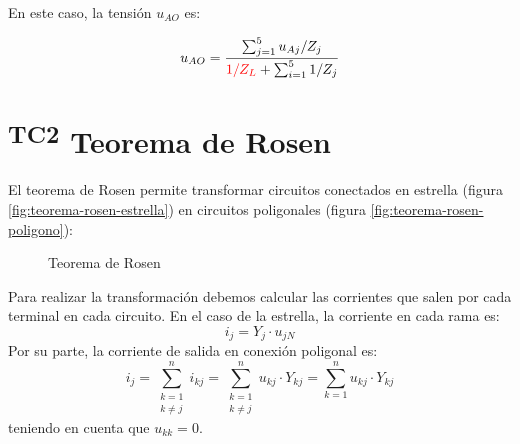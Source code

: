 En este caso, la tensión $u_{AO}$ es:

\begin{equation}
  u_{AO} = \frac{\sum_{j = 1}^5 u_{Aj}/Z_j}{{\color{red} 1/Z_L} + \sum_{i = 1}^5 1/Z_j}
\end{equation}

\section{\textsuperscript{TC2}  Teorema de Rosen}
\label{sec:teorema-rosen}

El teorema de Rosen permite transformar circuitos conectados en estrella (figura \ref{fig:teorema-rosen-estrella}) en circuitos poligonales (figura \ref{fig:teorema-rosen-poligono}):
\begin{figure}[H]
  \centering
  \hspace{2cm}
  \caption{Teorema de Rosen}
  \label{fig:teorema-rosen}
\end{figure}

Para realizar la transformación debemos calcular las corrientes que salen por cada terminal en cada circuito. En el caso de la estrella, la corriente en cada rama es:
\begin{equation}
  i_j = Y_j \cdot u_{jN}
\end{equation}
Por su parte, la corriente de salida en conexión poligonal es:
\begin{equation}
  i_j = \sum_{\substack{k = 1\\k \neq j}}^n i_{kj} = \sum_{\substack{k = 1\\k \neq j}}^n u_{kj} \cdot Y_{kj} = \sum_{k = 1}^n u_{kj} \cdot Y_{kj}  
\end{equation}
teniendo en cuenta que $u_{kk} = 0$.

